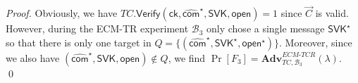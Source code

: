 \documentclass[10pt]{llncs}
\newcommand{\Adv}{\mathbf{Adv}}
\newcommand{\B}{\mathcal{B}}
\newcommand{\PP}{\mathsf{P}}
\newcommand{\SVK}{\mathsf{SVK}}
\newcommand{\ck}{\mathsf{ck}}
\newcommand{\com}{\hat{\mathsf{com}}}
\newcommand{\open}{\mathsf{open}}
\newcommand{\True}{\mathsf{True}}
\newcommand{\KeyGen}{{\mathsf{KeyGen}}}
\newcommand{\Verif}{{\mathsf{Verify}}}
\newcommand{\PPP}{\mathsf{PP}}
\begin{document}
\begin{proof}
  Obviously, we have $TC.\Verif(\ck, \com^\star, \SVK, \open) = 1$ since 
  $\vec{C}$ is valid. However, during the ECM-TR experiment $\B_3$ only 
  chose a single message $\SVK^\star$ so that there is only one target in
  $Q=\{(\com^\star,\SVK^\star,\open^\star)\}$. Moreover, since we also have
  $(\com^\star,\SVK,\open)\not\in Q$, we find
  $\Pr[F_3]=\Adv_{TC,\B_3}^{ECM\textrm{-}TCR}(\lambda)$.
  \qed
%  
%  
%  
%  
%
%
%  
\end{proof}
\end{document}
